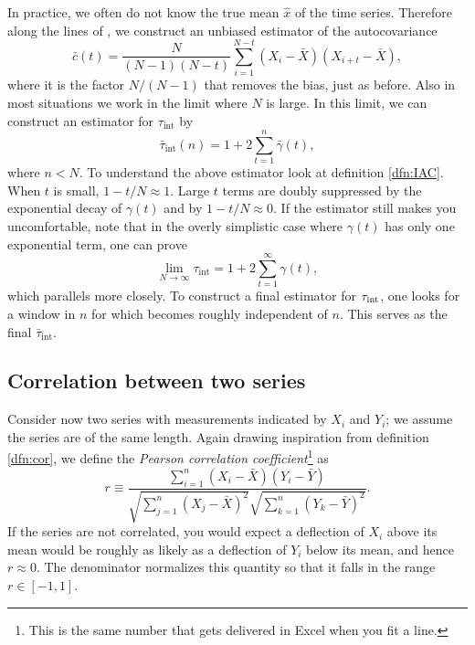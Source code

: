 In practice, we often do not know the true mean $\hat{x}$ of the time series.
Therefore along the lines of , we construct an unbiased
estimator of the autocovariance
\begin{equation}
  \bar{c}(t)=\frac{N}{(N-1)(N-t)}
    \sum_{i=1}^{N-t}(X_i-\bar{X})(X_{i+t}-\bar{X}),
\end{equation}
where it is the factor $N/(N-1)$ that removes the bias, just as before.
Also in most situations we work in the limit where $N$ is large. In this
limit, we can construct an estimator for $\tau_\text{int}$ by
\begin{equation}\label{eq:IACest}
  \bar{\tau}_\text{int}(n)=1+2\sum_{t=1}^n\bar{\gamma}(t),
\end{equation}
where $n<N$. To understand the above estimator look at definition
\eqref{dfn:IAC}. When $t$ is small, $1-t/N\approx 1$. Large $t$ terms
are doubly suppressed by the exponential decay of $\gamma(t)$ and
by $1-t/N\approx 0$. If the estimator still makes you uncomfortable,
note that in the overly simplistic case where
$\gamma(t)$ has only one exponential term, one can prove
\begin{equation}
  \lim_{N\to\infty}\tau_\text{int}=1+2\sum_{t=1}^\infty\gamma(t),
\end{equation}
which parallels  more closely. To construct a final
estimator for $\tau_\text{int}$, one looks for a window in $n$ for which
 becomes roughly independent of $n$. This serves
as the final $\bar{\tau}_\text{int}$.

\subsection{Correlation between two series}


Consider now two series with measurements indicated by $X_i$ and $Y_i$;
we assume the series are of the same length. Again drawing
inspiration from definition \eqref{dfn:cor}, we define the
{\it Pearson correlation coefficient}\footnote{This is the same number that gets 
delivered in Excel when you fit a line.}
as
\begin{equation}
r\equiv
\frac{\sum_{i=1}^n\left(X_i-\bar{X}\right)\left(Y_i-\bar{Y}\right)}{\sqrt{\sum_{j=1}^n\left(X_j-\bar{X}\right)^2}
\sqrt{\sum_{k=1}^n\left(Y_k-\bar{Y}\right)^2}}.
\end{equation}
If the series are not correlated, you would expect a deflection of $X_i$
above its mean would be roughly as likely as a deflection of $Y_i$
below its mean, and hence $r\approx0$. The denominator normalizes this
quantity so that it falls in the range $r\in[-1,1]$.

